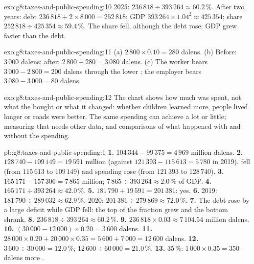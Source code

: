 \begin{solution}{exo:g8:taxes-and-public-spending:10}
2025: $236\,818 \div 393\,264 \approx 60.2\,\%$. After two years: debt $236\,818 + 2 \times 8\,000 =
252\,818$; GDP $393\,264 \times 1.04^{2} \approx 425\,354$; share $252\,818 \div 425\,354 \approx
59.4\,\%$. The share fell, although the debt rose: GDP grew faster than the debt.
\end{solution}

\begin{solution}{exo:g8:taxes-and-public-spending:11}
(a) $2\,800 \times 0.10 = 280$ dalens. (b) Before: $3\,000$ dalens; after: $2\,800 + 280 = 3\,080$
dalens. (c) The worker bears $3\,000 - 2\,800 = 200$ dalens through the lower ; the employer
bears $3\,080 - 3\,000 = 80$ dalens.
\end{solution}

\begin{solution}{exo:g8:taxes-and-public-spending:12}
The chart shows how much was spent, not what the  bought or what it changed: whether children
learned more, people lived longer or roads were better. The same spending can achieve a lot or little;
measuring that needs other data, and comparisons of what happened with and without the spending.
\end{solution}

\begin{solution}{pb:g8:taxes-and-public-spending:1}
\textbf{1.} $104\,344 - 99\,375 = 4\,969$ million dalens.
\textbf{2.} $128\,740 - 109\,149 = 19\,591$ million (against $121\,393 - 115\,613 = 5\,780$ in 2019).
 fell (from $115\,613$ to $109\,149$) and spending rose (from $121\,393$ to $128\,740$).
\textbf{3.} $165\,171 - 157\,306 = 7\,865$ million; $7\,865 \div 393\,264 \approx 2.0\,\%$ of GDP.
\textbf{4.} $165\,171 \div 393\,264 \approx 42.0\,\%$.
\textbf{5.} $181\,790 + 19\,591 = 201\,381$: yes.
\textbf{6.} 2019: $181\,790 \div 289\,032 \approx 62.9\,\%$. 2020: $201\,381 \div 279\,869 \approx
72.0\,\%$.
\textbf{7.} The debt rose by a large deficit while GDP fell: the top of the fraction grew and the bottom
shrank.
\textbf{8.} $236\,818 \div 393\,264 \approx 60.2\,\%$.
\textbf{9.} $236\,818 \times 0.03 \approx 7\,104.54$ million dalens.
\textbf{10.} $(30\,000 - 12\,000) \times 0.20 = 3\,600$ dalens.
\textbf{11.} $28\,000 \times 0.20 + 20\,000 \times 0.35 = 5\,600 + 7\,000 = 12\,600$ dalens.
\textbf{12.} $3\,600 \div 30\,000 = 12.0\,\%$; $12\,600 \div 60\,000 = 21.0\,\%$.
\textbf{13.} $35\,\%$: $1\,000 \times 0.35 = 350$ dalens more .
\end{solution}
